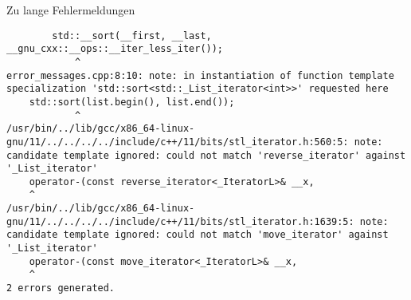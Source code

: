 \begin{frame}{Zu lange Fehlermeldungen}
\begin{verbatim}
        std::__sort(__first, __last, __gnu_cxx::__ops::__iter_less_iter());
            ^
error_messages.cpp:8:10: note: in instantiation of function template specialization 'std::sort<std::_List_iterator<int>>' requested here
    std::sort(list.begin(), list.end());
            ^
/usr/bin/../lib/gcc/x86_64-linux-gnu/11/../../../../include/c++/11/bits/stl_iterator.h:560:5: note: candidate template ignored: could not match 'reverse_iterator' against '_List_iterator'
    operator-(const reverse_iterator<_IteratorL>& __x,
    ^
/usr/bin/../lib/gcc/x86_64-linux-gnu/11/../../../../include/c++/11/bits/stl_iterator.h:1639:5: note: candidate template ignored: could not match 'move_iterator' against '_List_iterator'
    operator-(const move_iterator<_IteratorL>& __x,
    ^
2 errors generated.
\end{verbatim}

\end{frame}